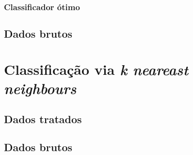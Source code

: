 \subsubsection{Classificador ótimo}





\subsection{Dados brutos}








\section{Classificação via \textit{k neareast neighbours}}




\subsection{Dados tratados}





\subsection{Dados brutos}





